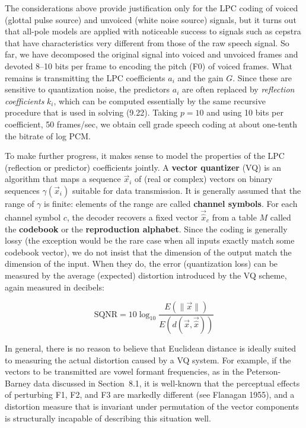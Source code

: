 \smallskip
The considerations above provide justification only for the LPC coding of
voiced (glottal pulse source) and unvoiced (white noise source) signals, but
it turns out that all-pole models are applied with noticeable success to
signals such as cepstra that have characteristics very different from those of
the raw speech signal. So far, we have decomposed the original signal into
voiced and unvoiced frames and devoted 8--10 bits per frame to encoding the
pitch (F0) of voiced frames. What remains is transmitting the LPC coefficients
$a_i$ and the gain $G$. Since these are sensitive to quantization noise, the
predictors $a_i$ are often replaced by {\it reflection coefficients} $k_i$,
which can be computed essentially by the same recursive procedure that is used
in solving (9.22). Taking $p=10$ and using 10 bits per coefficient, 50
frames/sec, we obtain cell grade speech coding at about one-tenth the bitrate
of log PCM.

To make further progress, it makes sense to model the properties of the LPC
(reflection or predictor) coefficients jointly. A {\bf vector quantizer} (VQ)
is an algorithm that maps a sequence $\vec{x}_i$ of (real or complex) vectors
on binary sequences $\gamma(\vec{x}_i)$ suitable for data transmission. It is
generally assumed that the range of $\gamma$ is finite: elements of the range
are called {\bf channel symbols}. For each channel symbol $c$, the decoder
recovers a fixed vector ${\vec{\hat{x}}_c}$ from a table $M$ called the {\bf
  codebook} or the {\bf reproduction
  alphabet}. Since
the coding is generally lossy (the exception would be the rare case when all
inputs exactly match some codebook vector), we do not insist that the
dimension of the output match the dimension of the input. When they do, the
error (quantization loss) can be measured by the average (expected) distortion
introduced by the VQ scheme, again measured in decibels:

\begin{equation}
\text{SQNR} = 10 \log_{10} \frac{E(\|\vec{x}\|)}{E(d(\vec{x},\vec{\hat{x}}))}
\end{equation}

\noindent
In general, there is no reason to believe that Euclidean distance is ideally
suited to measuring the actual distortion caused by a VQ system. For example,
if the vectors to be transmitted are vowel formant frequencies, as in the
Peterson-Barney data discussed in Section~8.1, it is well-known that the
perceptual effects of perturbing F1, F2, and F3 are markedly different (see
Flanagan 1955),\nocite{Flanagan:1955} and a distortion measure that is
invariant under permutation of the vector components is structurally incapable
of describing this situation well.


